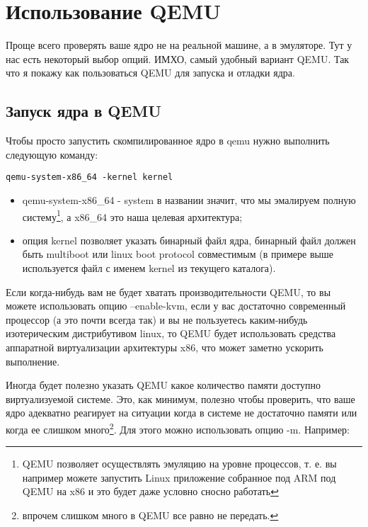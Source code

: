 \section{Использование QEMU}

Проще всего проверять ваше ядро не на реальной машине, а в эмуляторе. Тут у
нас есть некоторый выбор опций. ИМХО, самый удобный вариант QEMU. Так что я
покажу как пользоваться QEMU для запуска и отладки ядра.

\subsection{Запуск ядра в QEMU}

Чтобы просто запустить скомпилированное ядро в qemu нужно выполнить следующую
команду:

\begin{verbatim}
qemu-system-x86_64 -kernel kernel
\end{verbatim}

\begin{itemize}
  \item qemu-system-x86\_64 - system в названии значит, что мы эмалируем полную
        систему\footnote{QEMU позволяет осуществлять эмуляцию на уровне
        процессов, т. е. вы например можете запустить Linux приложение
        собранное под ARM под QEMU на x86 и это будет даже условно сносно
        работать}, а x86\_64 это наша целевая архитектура;
  \item опция kernel позволяет указать бинарный файл ядра, бинарный файл должен
        быть multiboot или linux boot protocol совместимым (в примере выше
        используется файл с именем kernel из текущего каталога).
\end{itemize}

Если когда-нибудь вам не будет хватать производительности QEMU, то вы можете
использовать опцию --enable-kvm, если у вас достаточно современный процессор (а
это почти всегда так) и вы не пользуетесь каким-нибудь изотерическим
дистрибутивом linux, то QEMU будет использовать средства аппаратной
виртуализации архитектуры x86, что может заметно ускорить выполнение.

Иногда будет полезно указать QEMU какое количество памяти доступно
виртуализуемой системе. Это, как минимум, полезно чтобы проверить, что ваше
ядро адекватно реагирует на ситуации когда в системе не достаточно памяти или
когда ее слишком много\footnote{впрочем слишком много в QEMU все равно не
передать.}. Для этого можно использовать опцию -m. Например:

